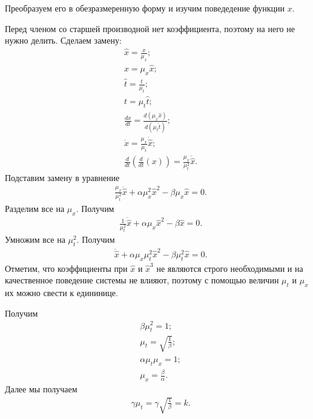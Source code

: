 \documentclass[14pt]{extarticle}
\begin{document}
Преобразуем его в обезразмеренную форму и изучим поведедение функции $x$.

Перед членом со старшей производной нет коэффициента, поэтому на него не нужно делить. Сделаем замену:
\begin{equation}
  \begin{aligned}
    &\hat{x} = \frac{x}{\mu_x};\\
    &x=\mu_x\hat{x};\\
    &\hat{t} = \frac{t}{\mu_t};\\
    &t=\mu_t\hat{t};\\
    &\frac{dx}{dt}=\frac{d(\mu_x\hat{x})}{d(\mu_t\hat{t})};\\
    &\dot{x} = \frac{\mu_x}{\mu_t}\dot{\hat{x}};\\
    &\frac{d}{dt}\left(\frac{d}{dt}(x)\right)=\frac{\mu_x}{\mu_t^2}\ddot{\hat{x}}.
  \end{aligned}
\end{equation}
Подставим замену в уравнение
\begin{equation}
  \begin{aligned}
    &\frac{\mu_x}{\mu_t^2}\ddot{\hat{x}} +\alpha\mu_x^2\hat{x}^2 - \beta\mu_x\hat{x}=0.
  \end{aligned}
\end{equation}
Разделим все на $\mu_x$.
Получим
\begin{equation}
  \begin{aligned}
    &\frac{1}{\mu_t^2}\ddot{\hat{x}} +\alpha\mu_x\hat{x}^2 - \beta\hat{x}=0.
  \end{aligned}
\end{equation}
Умножим все на $\mu_t^2$.
Получим
\begin{equation}
  \begin{aligned}
    &\ddot{\hat{x}} +\alpha\mu_x\mu_t^2\hat{x}^2 - \beta\mu_t^2\hat{x}=0.
  \end{aligned}
\end{equation}
Отметим, что коэффициенты при $\hat{x}$ и $\hat{x}^3$ не являются строго необходимыми и на качественное поведение системы не влияют, поэтому с помощью величин $\mu_t$ и $\mu_x$ их можно свести к едининице.

Получим
\begin{equation}
  \begin{aligned}
    &\beta\mu_t^2=1;\\
    &\mu_t = \sqrt{\frac{1}{\beta}};\\
    &\alpha\mu_t\mu_x=1;\\
    &\mu_x=\frac{\beta}{\alpha}.
  \end{aligned}
\end{equation}
Далее мы получаем
\begin{equation}
  \begin{aligned}
    &\gamma\mu_t=\gamma\sqrt{\frac{1}{\beta}}=k.
  \end{aligned}
\end{equation}
\end{document}
